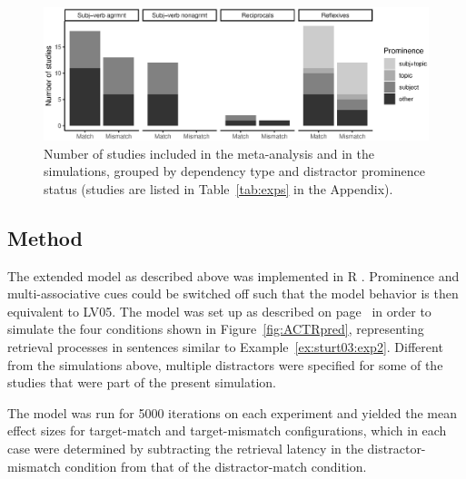 \documentclass{cambridge7A}\usepackage[]{graphicx}\usepackage[]{color}
\newenvironment{knitrout}{}{} %
\newcommand{\R}{\textsf{R}}
\begin{document}
\begin{figure}[htbp]
\centering
\begin{knitrout}
\color{fgcolor}

{\centering \includegraphics[width=\textwidth]{figures/fig-datsumfig-1} 

}



\end{knitrout}
\caption{Number of studies included in the \cite{JaegerEngelmannVasishth2017} meta-analysis and in the simulations, grouped by dependency type and distractor prominence status (studies are listed in Table~\ref{tab:exps} in the Appendix).}
\label{fig:datasummary}
\end{figure}


\subsection{Method}

The extended model as described above was implemented in \R{} \citep{R2016}. Prominence and multi-associative cues could be switched off such that the model behavior is then equivalent to LV05.
The model was set up as described on page~\pageref{sec:generalmethods} in order to simulate the four conditions shown in Figure~\ref{fig:ACTRpred}, representing retrieval processes in sentences similar to Example~\ref{ex:sturt03:exp2}. 
Different from the simulations above, multiple distractors were specified for some of the studies that were part of the present simulation. 

The model was run for 5000 iterations on each experiment and yielded the mean effect sizes for target-match and target-mismatch configurations, which in each case were determined by subtracting the retrieval latency in the distractor-mismatch condition from that of the distractor-match condition.
\end{document}
